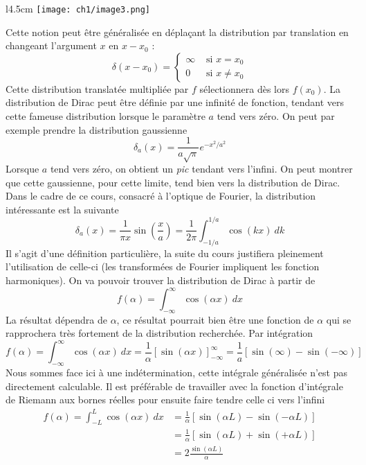 \begin{wrapfigure}[7]{l}{4.5cm}
\vspace{-13mm}
\texttt{[image: ch1/image3.png]}
\end{wrapfigure}
Cette notion peut être généralisée en déplaçant la distribution par translation en 
changeant l'argument $x$ en $x-x_0$ :
\begin{equation}
\delta(x-x_0) = \left\{\begin{array}{ll}
\infty & \text{ si } x=x_0\\
0 & \text{ si } x\neq x_0 
\end{array} \right.
\end{equation}
Cette distribution translatée multipliée par $f$ sélectionnera dès lors $f(x_0)$. 
La distribution de Dirac peut être définie par une infinité de fonction, tendant 
vers cette fameuse distribution lorsque le paramètre $a$ tend vers zéro. On peut 
par exemple prendre la distribution gaussienne 
\begin{equation}
\delta_a(x) = \frac{1}{a\sqrt{\pi}}e^{-x^2/a^2}  
\end{equation}
Lorsque $a$ tend vers zéro, on obtient un \textit{pic} tendant vers l'infini. On 
peut montrer que cette gaussienne, pour cette limite, tend bien vers la distribution 
de Dirac. Dans le cadre de ce cours, consacré à l'optique de Fourier, la distribution 
intéressante est la suivante
\begin{equation}
\delta_a(x) = \frac{1}{\pi x}\sin\left(\frac{x}{a}\right) = \frac{1}{2\pi}\int_{-1/a}^{1/a}
\cos(kx)\ dk
\end{equation}
Il s'agit d'une définition particulière, la suite du cours justifiera pleinement 
l'utilisation de celle-ci (les transformées de Fourier impliquent les fonction 
harmoniques). On va pouvoir trouver la distribution de Dirac à partir de
\begin{equation}
f(\alpha) = \int_{-\infty}^{\infty} \cos(\alpha x)\ dx
\end{equation}
La résultat dépendra de $\alpha$, ce résultat pourrait bien être une fonction de 
$\alpha$ qui se rapprochera très fortement de la distribution recherchée. Par 
intégration
\begin{equation}
f(\alpha) = \int_{-\infty}^{\infty} \cos(\alpha x)\ dx = \frac{1}{\alpha}\left[
\sin(\alpha x)\right]^\infty_{-\infty} = \frac{1}{a}[\sin(\infty)-\sin(-\infty)]
\end{equation}
Nous sommes face ici à une indétermination, cette intégrale généralisée n'est pas 
directement calculable. Il est préférable de travailler avec la fonction d'intégrale 
de Riemann aux bornes réelles pour ensuite faire tendre celle ci vers l'infini
\begin{equation}
\begin{array}{ll}
f(\alpha) = \int_{-L}^L \cos(\alpha x)\ dx &= \frac{1}{\alpha}[\sin(\alpha L)-\sin(-\alpha 
L)]\\
&= \frac{1}{\alpha}[\sin(\alpha L)+\sin(+\alpha L)]\\
&= 2\frac{\sin(\alpha L)}{\alpha}
\end{array}
\end{equation}

